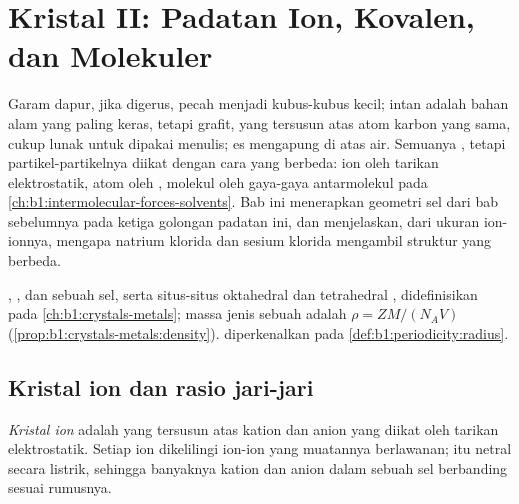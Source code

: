 \chapter{Kristal II: Padatan Ion, Kovalen, dan Molekuler}\label{ch:b1:crystals-ionic-covalent}

Garam dapur, jika digerus, pecah menjadi kubus-kubus kecil; intan adalah
bahan alam yang paling keras, tetapi grafit, yang tersusun atas atom
karbon yang sama, cukup lunak untuk dipakai menulis; es mengapung di atas
air. Semuanya , tetapi partikel-partikelnya diikat dengan cara
yang berbeda: ion oleh tarikan elektrostatik, atom oleh ,
molekul oleh gaya-gaya antarmolekul pada
\cref{ch:b1:intermolecular-forces-solvents}. Bab ini menerapkan geometri
sel dari bab sebelumnya pada ketiga golongan padatan ini, dan menjelaskan,
dari ukuran ion-ionnya, mengapa natrium klorida dan sesium klorida
mengambil struktur yang berbeda.

\begin{recall}
, , dan  sebuah sel, serta
situs-situs oktahedral dan tetrahedral  ,
didefinisikan pada \cref{ch:b1:crystals-metals}; massa jenis sebuah
 adalah $\rho = ZM/(N_A V)$
(\cref{prop:b1:crystals-metals:density}).  diperkenalkan
pada \cref{def:b1:periodicity:radius}.
\end{recall}

\section{Kristal ion dan rasio jari-jari}

\begin{definition}\label{def:b1:crystals-ionic-covalent:ionic-crystal}
\emph{Kristal ion} adalah  yang tersusun atas
kation dan anion yang diikat oleh tarikan elektrostatik. Setiap ion
dikelilingi ion-ion yang muatannya berlawanan;  itu netral secara
listrik, sehingga banyaknya kation dan anion dalam sebuah sel berbanding
sesuai rumusnya.
\end{definition}

